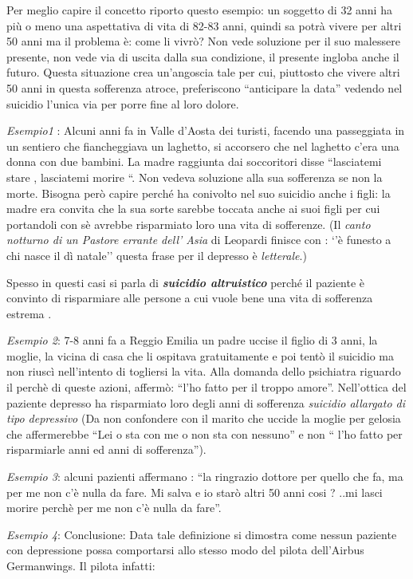 \documentclass[]{article}
\begin{document}
Per meglio capire il concetto riporto questo esempio: un soggetto di 32
anni ha più o meno una aspettativa di vita di 82-83 anni, quindi sa
potrà vivere per altri 50 anni ma il problema è: come li vivrò? Non vede
soluzione per il suo malessere presente, non vede via di uscita dalla
sua condizione, il presente ingloba anche il futuro. Questa situazione
crea un'angoscia tale per cui, piuttosto che vivere altri 50 anni in
questa sofferenza atroce, preferiscono ``anticipare la data'' vedendo
nel suicidio l'unica via per porre fine al loro dolore.

\emph{Esempio1} : Alcuni anni fa in Valle d'Aosta dei turisti, facendo
una passeggiata in un sentiero che fiancheggiava un laghetto, si
accorsero che nel laghetto c'era una donna con due bambini. La madre
raggiunta dai soccoritori disse ``lasciatemi stare , lasciatemi morire
``. Non vedeva soluzione alla sua sofferenza se non la morte. Bisogna
però capire perché ha conivolto nel suo suicidio anche i figli: la madre
era convita che la sua sorte sarebbe toccata anche ai suoi figli per cui
portandoli con sè avrebbe risparmiato loro una vita di sofferenze. (Il
\emph{canto notturno di un Pastore errante dell' Asia} di Leopardi
finisce con : `'è funesto a chi nasce il dì natale'' questa frase per il
depresso è \emph{letterale}.)

Spesso in questi casi si parla di \textbf{\emph{suicidio altruistico}}
perché il paziente è convinto di risparmiare alle persone a cui vuole
bene una vita di sofferenza estrema .

\emph{Esempio 2}: 7-8 anni fa a Reggio Emilia un padre uccise il figlio
di 3 anni, la moglie, la vicina di casa che li ospitava gratuitamente e
poi tentò il suicidio ma non riuscì nell'intento di togliersi la vita.
Alla domanda dello psichiatra riguardo il perchè di queste azioni,
affermò: ``l'ho fatto per il troppo amore''. Nell'ottica del paziente
depresso ha risparmiato loro degli anni di sofferenza \emph{suicidio
allargato di tipo depressivo} (Da non confondere con il marito che
uccide la moglie per gelosia che affermerebbe ``Lei o sta con me o non
sta con nessuno'' e non `` l'ho fatto per risparmiarle anni ed anni di
sofferenza'').

\emph{Esempio 3}: alcuni pazienti affermano : ``la ringrazio dottore per
quello che fa, ma per me non c'è nulla da fare. Mi salva e io starò
altri 50 anni cosi ? ..mi lasci morire perchè per me non c'è nulla da
fare''.

\emph{Esempio 4}: Conclusione: Data tale definizione si dimostra come
nessun paziente con depressione possa comportarsi allo stesso modo del
pilota dell'Airbus Germanwings. Il pilota infatti:
\end{document}

